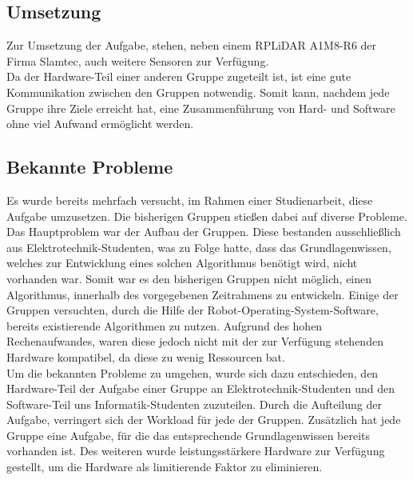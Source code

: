 \subsection{Umsetzung}
Zur Umsetzung der Aufgabe, stehen, neben einem RPLiDAR A1M8-R6 der Firma Slamtec, auch weitere Sensoren zur Verfügung. \\
Da der Hardware-Teil einer anderen Gruppe zugeteilt ist, ist eine gute Kommunikation zwischen den Gruppen notwendig. Somit kann, nachdem jede Gruppe ihre Ziele erreicht hat, eine Zusammenführung von Hard- und Software ohne viel Aufwand ermöglicht werden. \\

\subsection{Bekannte Probleme}
    Es wurde bereits mehrfach versucht, im Rahmen einer Studienarbeit, diese Aufgabe umzusetzen.
    Die bisherigen Gruppen stießen dabei auf diverse Probleme.
    Das Hauptproblem war der Aufbau der Gruppen.
    Diese bestanden ausschließlich aus Elektrotechnik-Studenten, was zu Folge hatte, dass das Grundlagenwissen, welches zur Entwicklung eines solchen Algorithmus benötigt wird, nicht vorhanden war.
    Somit war es den bisherigen Gruppen nicht möglich, einen Algorithmus, innerhalb des vorgegebenen Zeitrahmens zu entwickeln.
    Einige der Gruppen versuchten, durch die Hilfe der Robot-Operating-System-Software, bereits existierende Algorithmen zu nutzen. 
    Aufgrund des hohen Rechenaufwandes, waren diese jedoch nicht mit der zur Verfügung stehenden Hardware kompatibel, da diese zu wenig Ressourcen bat. \\ %


    Um die bekannten Probleme zu umgehen, wurde sich dazu entschieden, den Hardware-Teil der Aufgabe einer Gruppe an Elektrotechnik-Studenten und den Software-Teil uns Informatik-Studenten zuzuteilen.
    Durch die Aufteilung der Aufgabe, verringert sich der Workload für jede der Gruppen. 
    Zusätzlich hat jede Gruppe eine Aufgabe, für die das entsprechende Grundlagenwissen bereits vorhanden ist.
    Des weiteren wurde leistungsstärkere Hardware zur Verfügung gestellt, um die Hardware als limitierende Faktor zu eliminieren. %

\newpage
